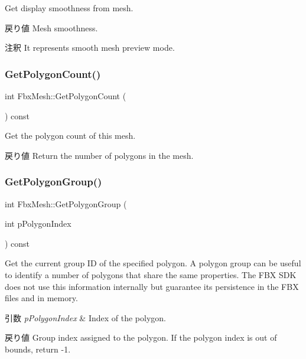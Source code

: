 Get display smoothness from mesh. \begin{DoxyReturn}{戻り値}
Mesh smoothness. 
\end{DoxyReturn}
\begin{DoxyRemark}{注釈}
It represents smooth mesh preview mode. 
\end{DoxyRemark}
\mbox{\label{class_fbx_mesh_a0f443f6d64284e6b60bdd52fb1f53ea7}} 
\subsubsection{\texorpdfstring{Get\+Polygon\+Count()}{GetPolygonCount()}}
{\footnotesize\ttfamily int Fbx\+Mesh\+::\+Get\+Polygon\+Count (\begin{DoxyParamCaption}{ }\end{DoxyParamCaption}) const}

Get the polygon count of this mesh. \begin{DoxyReturn}{戻り値}
Return the number of polygons in the mesh. 
\end{DoxyReturn}
\mbox{\label{class_fbx_mesh_aca17b9c024aa056115bdb173daf25e8c}} 
\subsubsection{\texorpdfstring{Get\+Polygon\+Group()}{GetPolygonGroup()}}
{\footnotesize\ttfamily int Fbx\+Mesh\+::\+Get\+Polygon\+Group (\begin{DoxyParamCaption}\item[{int}]{p\+Polygon\+Index }\end{DoxyParamCaption}) const}

Get the current group ID of the specified polygon. A polygon group can be useful to identify a number of polygons that share the same properties. The F\+BX S\+DK does not use this information internally but guarantee its persistence in the F\+BX files and in memory. 
\begin{DoxyParams}{引数}
{\em p\+Polygon\+Index} & Index of the polygon. \\
\hline
\end{DoxyParams}
\begin{DoxyReturn}{戻り値}
Group index assigned to the polygon. If the polygon index is out of bounds, return -\/1. 
\end{DoxyReturn}
\mbox{\label{class_fbx_mesh_a775d0e10dc67bbcb9f7368d828588e55}} 
